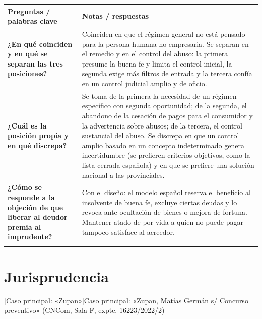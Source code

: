 \documentclass[12pt,oneside]{book}
\makeatletter
\renewcommand\section{\@startsection{section}{1}{\z@}{-3.5ex \@plus -1ex \@minus -.2ex}{2.3ex \@plus.2ex}{\normalfont\Large\bfseries\raggedright}}
\newcommand{\cornellresumen}[1]{%
  \midrule
  \multicolumn{2}{@{}p{\dimexpr0.92\textwidth+2\tabcolsep+\arrayrulewidth\relax}@{}}{%
    \textbf{Resumen:} #1} \\
}
\newenvironment{cornell}{%
  \renewcommand{\arraystretch}{1.2}%
  \begin{longtable}{@{}>{\raggedright\arraybackslash}p{0.27\textwidth}|>{\raggedright\arraybackslash}p{0.65\textwidth}@{}}
  \toprule
  \textbf{Preguntas / palabras clave} & \textbf{Notas / respuestas} \\
  \midrule
  \endhead
}{%
  \bottomrule
  \end{longtable}%
}
\makeatother
\begin{document}
\begin{cornell}
\textbf{¿En qué coinciden y en qué se separan las tres posiciones?} &
Coinciden en que el régimen general no está pensado para la persona humana no empresaria. Se separan en el remedio y en el control del abuso: la primera presume la buena fe y limita el control inicial, la segunda exige más filtros de entrada y la tercera confía en un control judicial amplio y de oficio. \\
\addlinespace

\textbf{¿Cuál es la posición propia y en qué discrepa?} &
Se toma de la primera la necesidad de un régimen específico con segunda oportunidad; de la segunda, el abandono de la cesación de pagos para el consumidor y la advertencia sobre abusos; de la tercera, el control sustancial del abuso. Se discrepa en que un control amplio basado en un concepto indeterminado genera incertidumbre (se prefieren criterios objetivos, como la lista cerrada española) y en que se prefiere una solución nacional a las provinciales. \\
\addlinespace

\textbf{¿Cómo se responde a la objeción de que liberar al deudor premia al imprudente?} &
Con el diseño: el modelo español reserva el beneficio al insolvente de buena fe, excluye ciertas deudas y lo revoca ante ocultación de bienes o mejora de fortuna. Mantener atado de por vida a quien no puede pagar tampoco satisface al acreedor. \\
\cornellresumen{La doctrina coincide en el diagnóstico (régimen general inadecuado) pero difiere en el remedio y en el control del abuso: presunción de buena fe y \textit{fresh start}, procedimiento provincial para el consumidor con filtros, o control judicial amplio y de oficio. La posición propia combina un régimen nacional específico, criterios objetivos de buena fe y control sustancial del abuso.}
\end{cornell}

\chapter[Jurisprudencia]{Jurisprudencia}
\label{cap:jurisprudencia}

\section[Caso principal: «Zupan»]{Caso principal: «Zupan, Matías Germán s/ Concurso preventivo» (CNCom, Sala F, expte. 16223/2022/2)}
\label{sec:zupan}
\end{document}
